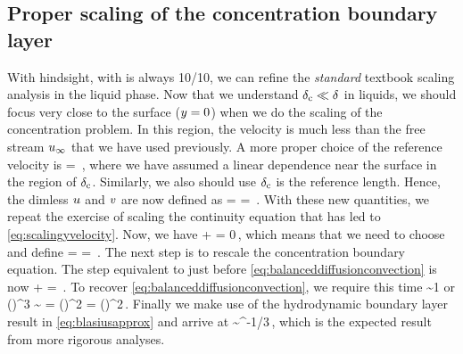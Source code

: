 \subsection{Proper scaling of the concentration boundary layer}
With hindsight, with is always 10/10, we can refine the \emph{standard} textbook scaling analysis in the liquid phase. Now that we understand $\delta_\text{c}\ll\delta$ in liquids, we should focus very close to the surface ($y = 0$) when we do the scaling of the concentration problem. In this region, the velocity is much less than the free stream $u_{\infty}$ that we have used previously. A more proper choice of the reference velocity is
\beq
\vely = \dfrac{\cblthck}{\blthck}\fsvel\,,
\eeq
where we have assumed a linear dependence near the surface in the region of $\delta_\text{c}$. Similarly, we also should use $\delta_\text{c}$ is the reference length. Hence, the dimless $u$ and $v$ are now defined as
\beq
\ndvelx = \dfrac{\velx}{\fsvel\cblthck/\blthck}\quad{}\quad
\ndvely = \dfrac{\vely}{\cblthck}\,.
\eeq
With these new quantities, we repeat the exercise of scaling the continuity equation that has led to \cref{eq:scalingyvelocity}. Now, we have
\beq
\dfrac{\cblthck}{\blthck}\dfrac{\fsvel}{\length}\xpd\ndvelx\ndposx +
\xpd\ndvely\ndposy = 0\,,
\eeq
which means that we need to choose and define
\beq
\vely{} = \dfrac{\fsvel}{\length}\quad{}\quad
\ndvely = \,.
\eeq
The next step is to rescale the concentration boundary equation. The step equivalent to just before \cref{eq:balanceddiffusionconvection} is now
\beq
\ndvelx\xpd\conc\ndposx + \ndvely\xpd\conc\ndposy = 
\conc\ndposy\,.
\eeq
To recover \cref{eq:balanceddiffusionconvection}, we require this time
\beq
{}\sim 1
\eeq
or
\beq
\left(\dfrac{\cblthck}{\blthck}\right)^3 \sim {} 
                                         = \left(\dfrac{\length}{\blthck}\right)^2
                                         = \left(\dfrac{\length}{\blthck}\right)^2\,.
\eeq
Finally we make use of the hydrodynamic boundary layer result in \cref{eq:blasiusapprox} and arrive at
\beq
\dfrac{\cblthck}{\blthck}\sim\kschmidt^{-1/3}\,,
\eeq
which is the expected result from more rigorous analyses.
